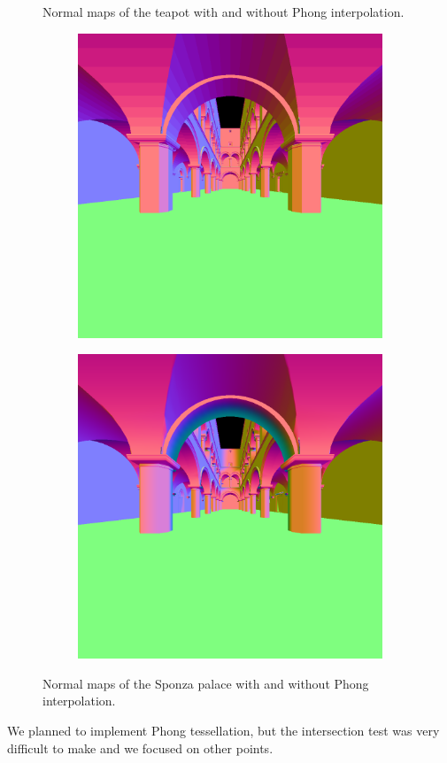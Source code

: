 \documentclass[a4paper,11pt]{article}%
\begin{document}
\begin{figure}[h]
    \caption{Normal maps of the teapot with and without Phong interpolation.}
    \label{fig:normalteapot}
\end{figure}

\begin{figure}[h]
    \centering
    
\begin{subfigure}{.5\textwidth}
  \centering
  \includegraphics[width=.9\linewidth]{img/nnsponza.png}
\end{subfigure}%
\begin{subfigure}{.5\textwidth}
  \centering
  \includegraphics[width=.9\linewidth]{img/nsponza.png}
\end{subfigure}    
    
    \caption{Normal maps of the Sponza palace with and without Phong interpolation.}
    \label{fig:normalsponza}
\end{figure}
We planned to implement Phong tessellation, but the intersection test was very difficult to make and we focused on other points.
\end{document}
